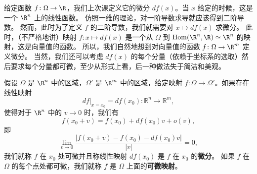 
给定函数 $f\colon \Omega\rightarrow \R$，我们上次课定义它的微分 $df(x)$。当 $x$ 给定的时候，这是一个 $\R^n$ 上的线性函数。
仿照一维的理论，对一阶导数求导就应该得到二阶导数。
然而，此时为了定义 $f$ 的二阶导数，我们就需要对 $x\mapsto df(x)$ 求微分。
此时，（不严格地讲）映射 $f\colon x\mapsto df(x)$ 是一个从 $\Omega$ 到 ${\rm Hom}(\R^n,\R)\simeq \R^n$ 的映射，这是向量值的函数。
所以，我们自然地想到对向量值的函数 $f\colon \Omega \rightarrow \R^m$ 定义微分。
当然，我们还可以考虑 $df(x)$ 的每个分量（依赖于坐标系的选取）然后要求每个分量都可微，至少从形式上看，后一种做法失于简洁和美观。

\begin{defn}[微分]
假设 $\Omega$ 是 $\R^n$ 中的区域，$\Omega'$ 是 $\R^m$ 中的区域，给定映射 $f\colon\Omega\rightarrow \Omega'$。如果存在线性映射
\[df\big|_{x=x_0}=df(x_0)\colon\mathbb{R}^n\rightarrow \mathbb{R}^m,\]
使得对于 $\R^n$ 中的 $v\rightarrow 0$ 时，我们有
\[f(x_0+v)=f(x_0)+df(x_0)v+o(v),\] 
即
\[\lim_{v\rightarrow 0}\frac{|f(x_0+v)-f(x_0)-df(x_0)v|}{|v|}=0,\]
我们就称 $f$ 在 $x_0$ 处可微并且称线性映射 $df(x_0)$ 是 $f$ 在 $x_0$ 的{\bf 微分}。
如果 $f$ 在 $\Omega$ 的每个点处都可微，我们就称 $f$ 是 $\Omega$ 上面的{\bf 可微映射}。
\end{defn}

